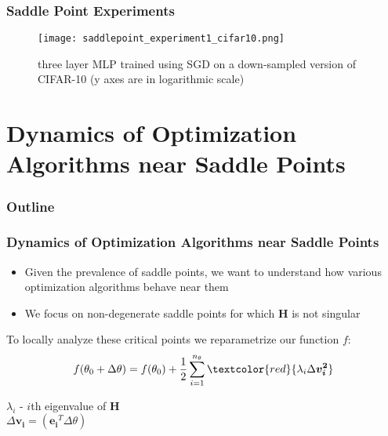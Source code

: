 \documentclass{beamer}
\begin{document}
\begin{frame}
\frametitle{Saddle Point Experiments}
\begin{figure}
\center
\texttt{[image: saddlepoint\_experiment1\_cifar10.png]}
\caption{three layer MLP trained using SGD on a down-sampled version of CIFAR-10 (y axes are in logarithmic scale)}
\end{figure}
\end{frame}


\section{Dynamics of Optimization Algorithms near Saddle Points}
\begin{frame}
\frametitle{Outline}
\tableofcontents[currentsection]
\end{frame}

\begin{frame}
\frametitle{Dynamics of Optimization Algorithms near Saddle Points}
\pause
\begin{itemize}
\item{Given the prevalence of saddle points, we want to understand how various optimization algorithms behave near them}
\pause
\item{We focus on non-degenerate saddle points for which $\bm{H}$ is not singular}
\end{itemize}
\pause
\vspace{-0.2in}
\begin{block}{}
To locally analyze these critical points we reparametrize our function $f$:
\vspace{-0.05in}
$$ f(\theta_0 + \Delta\theta) = f(\theta_0) + \frac{1}{2}\sum_{i=1}^{n_{\theta}}\textcolor{red}{\lambda_i \Delta \bm{v_{i}^2} }$$
\end{block}


$\lambda_i$  - $i$th eigenvalue of $\bm{H}$ \\
\vspace{0.04in}
$\Delta \bm{v_{i}} = (\bm{e_i}^{T} \Delta \theta)$\\


\end{frame}
\end{document}
